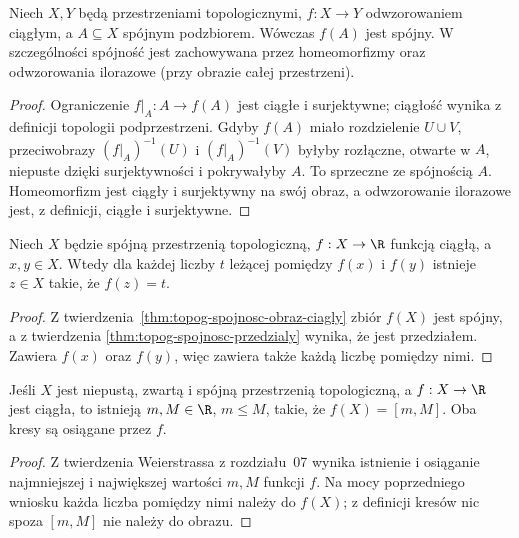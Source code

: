 \begin{twierdzenie}
\label{thm:topog-spojnosc-obraz-ciagly}
Niech $X,Y$ będą przestrzeniami topologicznymi,
$f:X\to Y$ odwzorowaniem ciągłym, a $A\subseteq X$
spójnym podzbiorem. Wówczas $f(A)$ jest spójny.
W szczególności spójność jest zachowywana
przez homeomorfizmy oraz odwzorowania ilorazowe
(przy obrazie całej przestrzeni).
\end{twierdzenie}
\begin{proof}
Ograniczenie $f|_A:A\to f(A)$ jest ciągłe
i surjektywne; ciągłość wynika z definicji
topologii podprzestrzeni. Gdyby $f(A)$
miało rozdzielenie $U\cup V$, przeciwobrazy
$(f|_A)^{-1}(U)$ i $(f|_A)^{-1}(V)$
byłyby rozłączne, otwarte w $A$, niepuste
dzięki surjektywności i pokrywałyby $A$.
To sprzeczne ze spójnością $A$.
Homeomorfizm jest ciągły i surjektywny
na swój obraz, a odwzorowanie ilorazowe
jest, z definicji, ciągłe i surjektywne.
\end{proof}

\begin{wniosek}
\label{cor:topog-spojnosc-wartosci-posredniej}
Niech $X$ będzie spójną przestrzenią topologiczną,
$f:X\to\R$ funkcją ciągłą, a $x,y\in X$.
Wtedy dla każdej liczby $t$ leżącej pomiędzy
$f(x)$ i $f(y)$ istnieje $z\in X$ takie,
że $f(z)=t$.
\end{wniosek}
\begin{proof}
Z twierdzenia~\ref{thm:topog-spojnosc-obraz-ciagly}
zbiór $f(X)$ jest spójny, a z twierdzenia
\ref{thm:topog-spojnosc-przedzialy} wynika,
że jest przedziałem. Zawiera $f(x)$ oraz
$f(y)$, więc zawiera także każdą liczbę
pomiędzy nimi.
\end{proof}

\begin{wniosek}
\label{cor:topog-spojnosc-zwarty-przedzial}
Jeśli $X$ jest niepustą, zwartą i spójną
przestrzenią topologiczną, a $f:X\to\R$
jest ciągła, to istnieją $m,M\in\R$, $m\le M$,
takie, że $f(X)=[m,M]$. Oba kresy są
osiągane przez $f$.
\end{wniosek}
\begin{proof}
Z twierdzenia Weierstrassa z rozdziału~07
wynika istnienie i osiąganie najmniejszej
i największej wartości $m,M$ funkcji $f$.
Na mocy poprzedniego wniosku każda liczba
pomiędzy nimi należy do $f(X)$; z definicji
kresów nic spoza $[m,M]$ nie należy do obrazu.
\end{proof}

